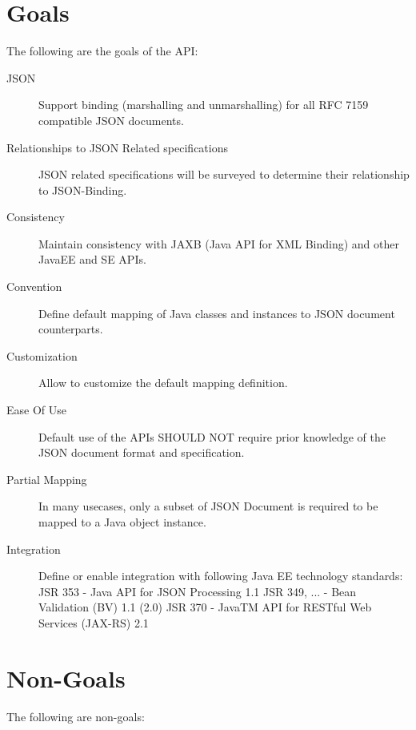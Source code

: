 \section{Goals}

The following are the goals of the API:

\begin{description}

\item[JSON] 
Support binding (marshalling and unmarshalling) for all RFC 7159 compatible JSON documents.

\item [Relationships to JSON Related specifications]
JSON related specifications will be surveyed to determine their relationship to JSON-Binding.

\item[Consistency] 
Maintain consistency with JAXB (Java API for XML Binding) and other JavaEE and SE APIs.

\item[Convention] 
Define default mapping of Java classes and instances to JSON document counterparts.

\item[Customization] 
Allow to customize the default mapping definition.

\item[Ease Of Use] 
Default use of the APIs SHOULD NOT require prior knowledge of the JSON document format and specification.

\item[Partial Mapping] 
In many usecases, only a subset of JSON Document is required to be mapped to a Java object  instance.

\item[Integration]
Define or enable integration with following Java EE technology standards:
 JSR 353 - Java API for JSON Processing 1.1
 JSR 349, ... - Bean Validation (BV) 1.1 (2.0)
 JSR 370 - JavaTM API for RESTful Web Services (JAX-RS) 2.1
  
\end{description}

\section{Non-Goals}
\label{non_goals}

The following are non-goals:

